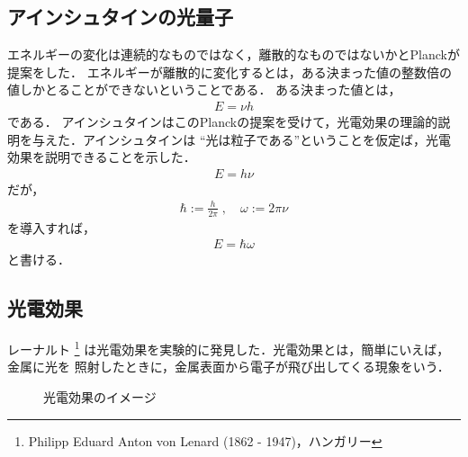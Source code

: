         \subsection{アインシュタインの光量子}
            エネルギーの変化は連続的なものではなく，離散的なものではないかとPlanckが提案をした．
            エネルギーが離散的に変化するとは，ある決まった値の整数倍の値しかとることができないということである．
            ある決まった値とは，
                \begin{align}
                    E=\nu h
                \end{align}
            である．
            アインシュタインはこのPlanckの提案を受けて，光電効果の理論的説明を与えた．アインシュタインは
            “光は粒子である”ということを仮定ば，光電効果を説明できることを示した．
                \begin{align}
                    E=h\nu
                \end{align}
            だが，
                \begin{align*}
                    \hbar := \frac{h}{2\pi}\;,\quad\omega:= 2\pi\nu
                \end{align*}
            を導入すれば，
                \begin{align}
                    E=\hbar\omega
                \end{align}
            と書ける．


        \subsection{光電効果}
            レーナルト
                \footnote{
                    Philipp Eduard Anton von Lenard (1862 - 1947)，ハンガリー
                }
            は光電効果を実験的に発見した．光電効果とは，簡単にいえば，金属に光を
            照射したときに，金属表面から電子が飛び出してくる現象をいう．
                        \begin{figure}[hbt]
                            \begin{center}
                                \caption{光電効果のイメージ}
                                \label{fig:kouden_kouka_image_1}
                            \end{center}
                        \end{figure}

